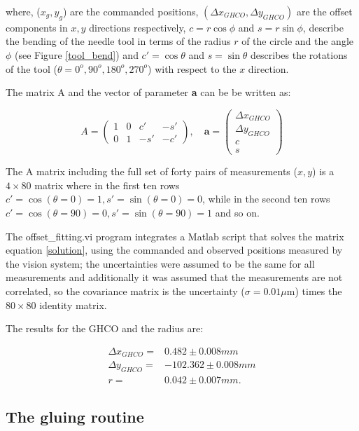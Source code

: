 \noindent where, ($x_g,y_g$) are the commanded positions, $(\Delta x_{GHCO},\Delta y_{GHCO})$ are the offset components in $x,y$ directions respectively, $c=r\cos\phi$ and  $s=r\sin\phi$, describe the bending of the needle tool in terms of the radius $r$ of the circle and the angle $\phi$ (see Figure \ref{tool_bend}) and $c'=\cos\theta$ and  $s=\sin\theta$ describes the rotations of the tool ($\theta=0^o, 90^o, 180^o, 270^o$) with respect to the $x$ direction.

The matrix A and the vector of parameter \textbf{a} can be be written as:

\begin{equation}
  A=
  \begin{pmatrix}
    1  & 0  & c' & -s' \\
    0  & 1  & -s' & -c' 
  \end{pmatrix}, \quad
  \textbf{a}=
  \begin{pmatrix}
    \Delta x_{GHCO}\\ 
    \Delta y_{GHCO}\\
    c \\
    s 
  \end{pmatrix}
\end{equation}


The A matrix including the full set of forty pairs of measurements ($x,y$) is a $4\times80$ matrix where in the first ten rows $c'=\cos(\theta=0)=1, s'=\sin(\theta=0)=0$, while in the second ten rows $c'=\cos(\theta=90)=0, s'=\sin(\theta=90)=1$ and so on.   

The offset\_fitting.vi program integrates a Matlab script that solves the matrix equation \ref{solution}, using the commanded and observed positions measured by the vision system; the uncertainties were assumed to be the same for all measurements and additionally it was assumed that the measurements are not correlated, so the covariance matrix is the uncertainty ($\sigma=0.01 \mu$m) times the $80\times80$ identity matrix.    

The results for the GHCO and the radius are:

\begin{align}
  \Delta x_{GHCO}=& 0.482 \pm 0.008 mm\nonumber\\
  \Delta y_{GHCO}=& -102.362 \pm 0.008 mm\\
  r=&0.042 \pm 0.007 mm\nonumber.
\end{align}

\subsection{The gluing routine}

